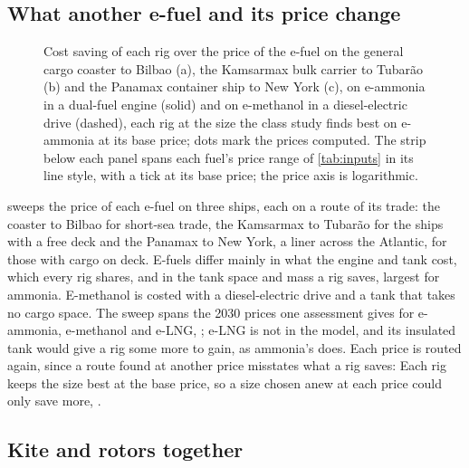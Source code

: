 \subsection{What another e-fuel and its price change}
\label{sec:res_fuels}

\begin{figure}[tbp]
\centering
{}
\caption{ Cost saving of each rig over the price of the e-fuel on the  general cargo coaster to Bilbao (a), the Kamsarmax bulk carrier to Tubarão (b) and the Panamax container ship to New York (c), on e-ammonia in a dual-fuel engine (solid) and on e-methanol in a diesel-electric drive (dashed), each rig at the size the class study finds best on e-ammonia at its base price; dots mark the prices computed. The strip below each panel spans each fuel's price range of \cref{tab:inputs} in its line style, with a tick at its base price; the price axis is logarithmic.}
\label{fig:fuels}
\end{figure}

  sweeps the price of each e-fuel on three ships, each on a route of its trade: the coaster to Bilbao for short-sea trade, the Kamsarmax to Tubarão for the ships with a free deck and the Panamax to New York, a liner across the Atlantic, for those with cargo on deck. E-fuels differ mainly in what the engine and tank cost, which every rig shares, and in the tank space and mass a rig saves, largest for ammonia. E-methanol is costed with a diesel-electric drive and a tank that takes no cargo space. The sweep spans the 2030 prices one assessment gives for e-ammonia, e-methanol and e-LNG,  \citep{lrumas2020}; e-LNG is not in the model, and its insulated tank would give a rig some more to gain, as ammonia's does. Each price is routed again, since a route found at another price misstates what a rig saves:  Each rig keeps the size best at the base price, so a size chosen anew at each price could only save more, .

\subsection{Kite and rotors together}
\label{sec:res_combination}


